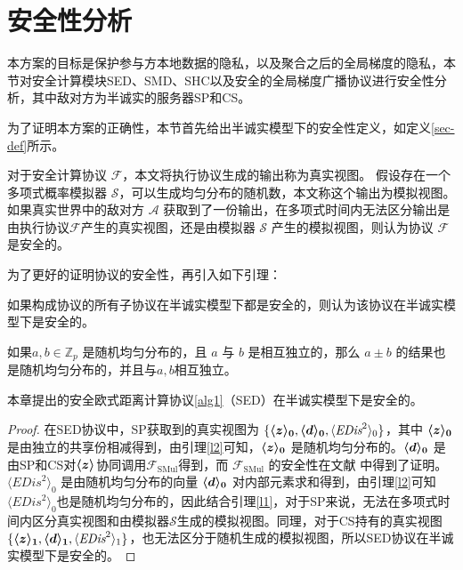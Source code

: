 \section{安全性分析}\label{4-analysis}
本方案的目标是保护参与方本地数据的隐私，以及聚合之后的全局梯度的隐私，本节对安全计算模块SED、SMD、SHC以及安全的全局梯度广播协议进行安全性分析，其中敌对方为半诚实的服务器SP和CS。

为了证明本方案的正确性，本节首先给出半诚实模型下的安全性定义，如定义\ref{sec-def}所示。

\begin{definition}\label{sec-def}	
	对于安全计算协议 $\mathcal{F}$，本文将执行协议生成的输出称为真实视图。
	假设存在一个多项式概率模拟器 $\mathcal{S}$，可以生成均匀分布的随机数，本文称这个输出为模拟视图。如果真实世界中的敌对方 $\mathcal{A}$ 获取到了一份输出，在多项式时间内无法区分输出是由执行协议$\mathcal{F}$产生的真实视图，还是由模拟器 $\mathcal{S}$ 产生的模拟视图，则认为协议 $\mathcal{F}$ 是安全的。
\end{definition}

为了更好的证明协议的安全性，再引入如下引理：
\begin{lemma}\label{l1}
	如果构成协议的所有子协议在半诚实模型下都是安全的，则认为该协议在半诚实模型下是安全的\cite{bi2020design}。
\end{lemma}

\begin{lemma}\label{l2}
	如果$ a, b \in \mathbb{Z}_p$ 是随机均匀分布的，且 $a$ 与 $b$ 是相互独立的，那么 $a \pm b$ 的结果也是随机均匀分布的，并且与$a,b$相互独立\cite{bogdanov2008sharemind}。
\end{lemma}

\begin{theorem}
	本章提出的安全欧式距离计算协议\ref{alg1}（SED）在半诚实模型下是安全的。
\end{theorem}

\begin{proof}\label{p1}
	在SED协议中，SP获取到的真实视图为 $\{\svec[0]{z}, \svec[0]{d}, \langle \textit{EDis}^2\rangle_0\}$，其中 $\svec[0]{z}$ 是由独立的共享份相减得到，由引理\ref{l2}可知，$\svec[0]{z}$ 是随机均匀分布的。$\svec[0]{d}$ 是由SP和CS对$\svec{z}$协同调用$\mathcal{F}_{\text {SMul}}$得到，而 $\mathcal{F}_{\text {SMul}}$ 的安全性在文献 \cite{rathee2021sirnn} 中得到了证明。$\langle \textit{EDis}^2\rangle_0$ 是由随机均匀分布的向量 $\svec[0]{d}$ 对内部元素求和得到，由引理\ref{l2}可知$\langle \textit{EDis}^2\rangle_0$也是随机均匀分布的，因此结合引理\ref{l1}，对于SP来说，无法在多项式时间内区分真实视图和由模拟器$\mathcal{S}$生成的模拟视图。同理，对于CS持有的真实视图 $\{\svec[1]{z}, \svec[1]{d}, \langle \textit{EDis}^2\rangle_1\}$，也无法区分于随机生成的模拟视图，所以SED协议在半诚实模型下是安全的。
\end{proof}


